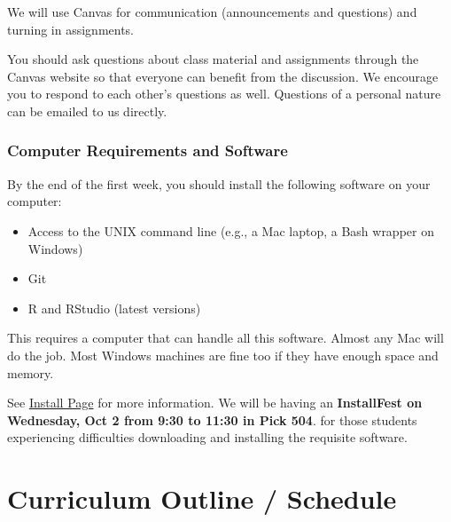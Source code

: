 \documentclass[]{book}
\providecommand{\tightlist}{%
  \setlength{\itemsep}{0pt}\setlength{\parskip}{0pt}}
\begin{document}
We will use Canvas for communication (announcements and questions) and turning in assignments.

You should ask questions about class material and assignments through the Canvas website so that everyone can benefit from the discussion. We encourage you to respond to each other's questions as well. Questions of a personal nature can be emailed to us directly.

\hypertarget{computer-requirements-and-software}{%
\subsubsection*{Computer Requirements and Software}\label{computer-requirements-and-software}}

By the end of the first week, you should install the following software on your computer:

\begin{itemize}
\tightlist
\item
  Access to the UNIX command line (e.g., a Mac laptop, a Bash wrapper on Windows)
\item
  Git
\item
  R and RStudio (latest versions)
\end{itemize}

This requires a computer that can handle all this software. Almost any Mac will do the job. Most Windows machines are fine too if they have enough space and memory.

See \href{installation}{Install Page} for more information. We will be having an \textbf{InstallFest on Wednesday, Oct 2 from 9:30 to 11:30 in Pick 504}. for those students experiencing difficulties downloading and installing the requisite software.

\hypertarget{curriculum-outline-schedule}{%
\section{Curriculum Outline / Schedule}\label{curriculum-outline-schedule}}
\end{document}

